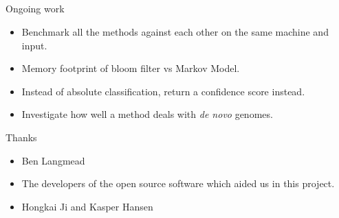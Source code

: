\documentclass[xcolor=x11names,compress]{beamer}
\renewcommand{\(}{\begin{columns}}
\renewcommand{\)}{\end{columns}}
\newcommand{\<}[1]{\begin{column}{#1}}
\renewcommand{\>}{\end{column}}
\begin{document}
\subsection{}
\begin{frame}{Ongoing work}
\begin{itemize}
	\item Benchmark all the methods against each other on the same machine and input.
	\item Memory footprint of bloom filter vs Markov Model.
	\item Instead of absolute classification, return a confidence score instead.
	\item Investigate how well a method deals with \emph{de novo} genomes.
\end{itemize}

\end{frame}
\begin{frame}{Thanks}
\begin{itemize}\itemsep1em
	\item Ben Langmead
	\item The developers of the open source software which aided us in this project.
	\item Hongkai Ji and Kasper Hansen
\end{itemize}

\end{frame}
\end{document}
